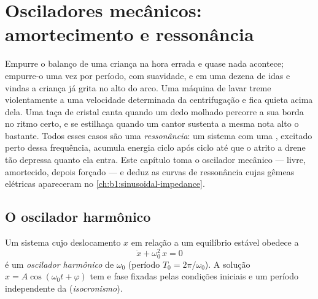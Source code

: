 \chapter{Osciladores mecânicos: amortecimento e ressonância}\label{ch:b1:oscillators-resonance}

Empurre o balanço de uma criança na hora errada e quase nada acontece; empurre-o
uma vez por período, com suavidade, e em uma dezena de idas e vindas a criança já
grita no alto do arco. Uma máquina de lavar treme violentamente
a uma velocidade determinada da centrifugação e fica quieta acima dela. Uma
taça de cristal canta quando um dedo molhado percorre a sua borda no ritmo
certo, e se estilhaça quando um cantor sustenta a mesma nota alto o bastante.
Todos esses casos são uma \emph{ressonância}: um sistema com uma , excitado perto dessa frequência, acumula energia ciclo após
ciclo até que o atrito a drene tão depressa quanto ela entra. Este
capítulo toma o oscilador mecânico --- livre, amortecido, depois forçado
--- e deduz as curvas de ressonância cujas gêmeas elétricas apareceram
no \cref{ch:b1:sinusoidal-impedance}.

\section{O oscilador harmônico}

\begin{definition}\label{def:b1:oscillators-resonance:harmonic}
Um sistema cujo deslocamento $x$ em relação a um equilíbrio estável obedece a
\[
\ddot x + \omega_0^2\,x = 0
\]
é um \emph{oscilador harmônico} de \emph{}
$\omega_0$ (período $T_0 = 2\pi/\omega_0$). A solução $x = A\cos(\omega_0t
+ \varphi)$ tem  e fase fixadas pelas condições iniciais
e um período independente da  (\emph{isocronismo}).
\end{definition}

